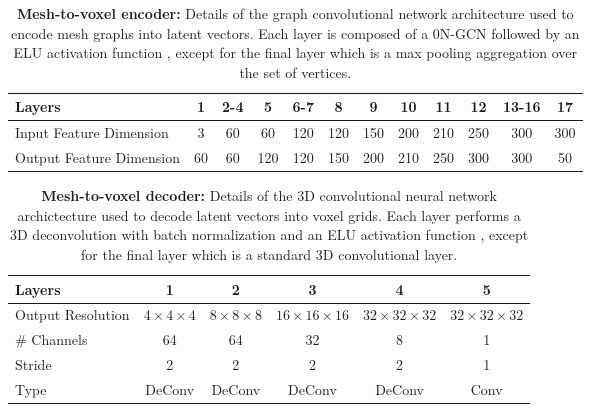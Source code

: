 \documentclass{article}
\begin{document}
\begin{table*}[ht]
\centering
\begin{tabular}{|l|c|c|c|c|c|c|c|c|c|c|c|}
\hline
Layers      & 1      & 2-4    & 5      & 6-7    & 8      & 9      & 10     & 11     & 12     & 13-16  & 17              \\ \hline
Input Feature Dimension  & 3      & 60     & 60     & 120    & 120    & 150    & 200    & 210    & 250    & 300    & 300             \\ \hline
Output Feature Dimension & 60     & 60     & 120    & 120    & 150    & 200    & 210    & 250    & 300    & 300    & 50              \\ \hline

\end{tabular}
\caption{\textbf{Mesh-to-voxel encoder:} Details of the graph convolutional network architecture used to encode mesh graphs into latent vectors. Each layer is composed of a 0N-GCN followed by an ELU activation function \cite{clevert2015fast}, except for the final layer which is a max pooling aggregation over the set of vertices.}
\label{table:MeshEncoder}
\end{table*}

\begin{table*}[ht]
\centering
\begin{tabular}{|l|c|c|c|c|c|}
\hline
Layers             & 1      & 2      & 3        & 4        & 5        \\ \hline
Output Resolution  & $4\times4\times4$  & $8\times8\times8$  & $16\times16\times16$ & $32\times32\times32$ & $32\times32\times32$ \\ \hline
\# Channels & 64     & 64     & 32       & 8        & 1        \\ \hline
Stride      & 2      & 2      & 2        & 2        & 1        \\ \hline
Type               & DeConv & DeConv & DeConv   & DeConv   & Conv     \\ \hline
\end{tabular}
\caption{\textbf{Mesh-to-voxel decoder:} Details of the 3D convolutional neural network archictecture used to decode latent vectors into voxel grids. Each layer performs a 3D deconvolution \cite{shelhamer2017fully} with batch normalization \cite{ioffe2015batch} and an ELU activation function \cite{clevert2015fast}, except for the final layer which is a standard 3D convolutional layer.}
\label{table:MeshDecoder}
\end{table*}
\end{document}
